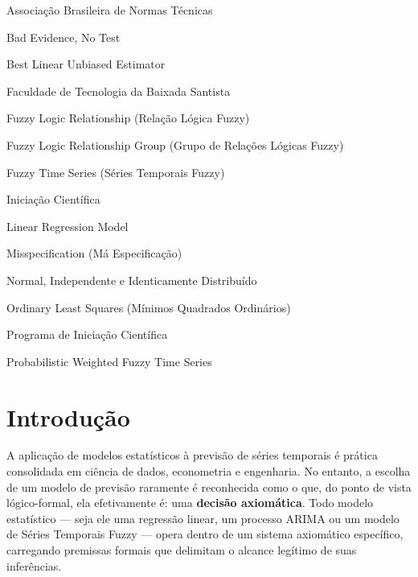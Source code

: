 \documentclass[
    12pt,
    oneside,
    openany,
    a4paper,
    english,
    brazil
]{abntex2}
\theoremstyle{definition}
\begin{document}
\begin{siglas}
    \item[ABNT] Associação Brasileira de Normas Técnicas
    \item[BENT] Bad Evidence, No Test
    \item[BLUE] Best Linear Unbiased Estimator
    \item[FATEC BS] Faculdade de Tecnologia da Baixada Santista
    \item[FLR] Fuzzy Logic Relationship (Relação Lógica Fuzzy)
    \item[FLRG] Fuzzy Logic Relationship Group (Grupo de Relações Lógicas Fuzzy)
    \item[FTS] Fuzzy Time Series (Séries Temporais Fuzzy)
    \item[IC] Iniciação Científica
    \item[LRM] Linear Regression Model
    \item[M-S] Misspecification (Má Especificação)
    \item[NIID] Normal, Independente e Identicamente Distribuído
    \item[OLS] Ordinary Least Squares (Mínimos Quadrados Ordinários)
    \item[PIC] Programa de Iniciação Científica
    \item[PWFTS] Probabilistic Weighted Fuzzy Time Series
\end{siglas}

\tableofcontents*
\cleardoublepage

\textual

\chapter{Introdução}
\label{cap:introducao}

A aplicação de modelos estatísticos à previsão de séries temporais é prática consolidada em ciência de dados, econometria e engenharia. No entanto, a escolha de um modelo de previsão raramente é reconhecida como o que, do ponto de vista lógico-formal, ela efetivamente é: uma \textbf{decisão axiomática}. Todo modelo estatístico --- seja ele uma regressão linear, um processo ARIMA ou um modelo de Séries Temporais Fuzzy --- opera dentro de um sistema axiomático específico, carregando premissas formais que delimitam o alcance legítimo de suas inferências.
\end{document}
